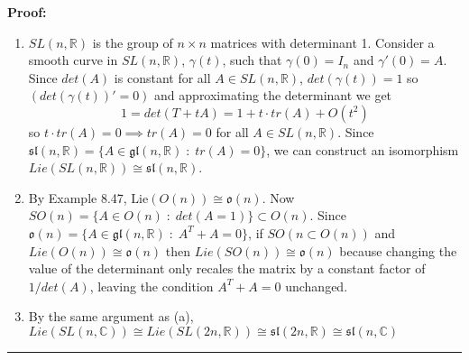 \documentclass{article}
\newcommand{\R}{\mathbb{R}}
\newcommand{\C}{\mathbb{C}}
\begin{document}
\vskip 0.5cm
\textbf{Proof:}

\begin{enumerate}[label=(\alph*)]
  \item $SL(n, \R)$ is the group of $n \times n$ matrices with determinant 1. Consider a smooth curve in $SL(n, \R)$, $\gamma(t)$, such that $\gamma(0) = I_n$ and $\gamma'(0) = A$. Since $det(A)$ is constant for all $A \in SL(n, \R)$, $det(\gamma(t)) = 1$ so $\left(det(\gamma(t))' = 0\right)$ and approximating the determinant we get 
  \[ 1 = det(T + tA) = 1 + t\cdot tr(A) + O(t^2) \]
  so $t \cdot tr(A) = 0 \implies tr(A) = 0$ for all $A \in SL(n, \R)$. Since $\mathfrak{sl}(n, \R) = \{A \in \mathfrak{gl}(n, \R)\;:\;tr(A) = 0\}$, we can construct an isomorphism $Lie(SL(n, \R)) \cong \mathfrak{sl}(n, \R)$.
  

  \item By Example 8.47, $\mathrm{Lie}(O(n)) \cong \mathfrak{o}(n)$. Now $SO(n) = \{A \in O(n)\;:\;det(A = 1)\} \subset O(n)$. Since $\mathfrak{o}(n) = \{A \in \mathfrak{gl}(n, \R)\;:\;A^T + A = 0\}$, if $SO(n \subset O(n))$ and $Lie(O(n)) \cong \mathfrak{o}(n)$ then $Lie(SO(n)) \cong \mathfrak{o}(n)$ because changing the value of the determinant only recales the matrix by a constant factor of $1/det(A)$, leaving the condition $A^T + A = 0$ unchanged.
  
  
  \item By the same argument as (a), $Lie(SL(n, \C)) \cong Lie(SL(2n, \R)) \cong \mathfrak{sl}(2n, \R) \cong \mathfrak{sl}(n, \C)$
\end{enumerate}

\vskip 0.5cm
\hrule 
\vskip 0.5cm






\end{document}
